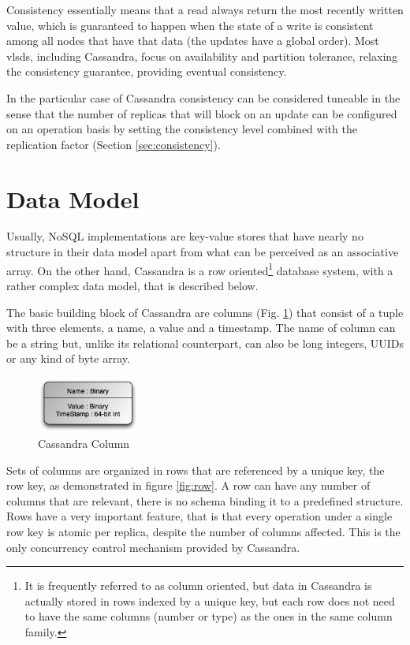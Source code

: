 Consistency essentially means that a read always return the most recently written value, which is guaranteed to happen when the state of a write is consistent among all nodes that have that data (the updates have a global order). Most \acp{vlsd}, including Cassandra, focus on availability and partition tolerance, relaxing the consistency guarantee, providing eventual consistency.  

In the particular case of Cassandra consistency can be considered tuneable in the sense that the number of replicas that will block on an update can be configured on an operation basis by setting the consistency level combined with the replication factor (Section \ref{sec:consistency}).


\section{Data Model}
\label{sec:cass_data_model}
Usually, NoSQL implementations are key-value stores that have nearly no structure in their data model apart from what can be perceived as an associative array. On the other hand, Cassandra is a row oriented\footnote{It is frequently referred to as column oriented, but data in Cassandra is actually stored in rows indexed by a unique key, but each row does not need to have the same columns (number or type) as the ones in the same column family.} database system, with a rather complex data model\cite{sarkissian09}, that is described below.

The basic building block of Cassandra are columns (Fig. \ref{fig:column}) that consist of a tuple with three elements, a name, a value and a timestamp. The name of column can be a string but, unlike its relational counterpart, can also be long integers, UUIDs or any kind of byte array.

\begin{figure}[htb]
  \begin{center}
    \leavevmode
    \includegraphics[width=0.3\textwidth]{images/column.jpg}
  \end{center}
  \caption{Cassandra Column}
  \label{fig:column}
\end{figure}

Sets of columns are organized in rows that are referenced by a unique key, the row key, as demonstrated in figure \ref{fig:row}. A row can have any number of columns that are relevant, there is no schema binding it to a predefined structure. Rows have a very important feature, that is that every operation under a single row key is atomic per replica, despite the number of columns affected. This is the only concurrency control mechanism provided by Cassandra.

